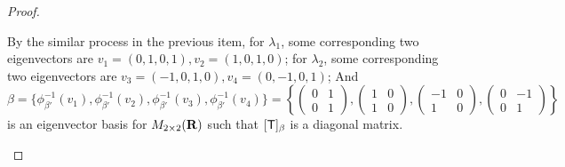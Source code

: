 \begin{proof}
\begin{enumerate}
By the similar process in the previous item,
for \(\lambda_1\), some corresponding two \LID{} eigenvectors are \(v_1 = (0, 1, 0, 1), v_2 = (1, 0, 1, 0)\);
for \(\lambda_2\), some corresponding two \LID{} eigenvectors are \(v_3 = (-1, 0, 1, 0), v_4 = (0, -1, 0, 1)\);
And
\[
    \beta = \{ \phi_{\beta'}^{-1}(v_1), \phi_{\beta'}^{-1}(v_2), \phi_{\beta'}^{-1}(v_3), \phi_{\beta'}^{-1}(v_4) \}
    = \left\{
        \begin{pmatrix} 0 & 1 \\ 0 & 1 \end{pmatrix},
        \begin{pmatrix} 1 & 0 \\ 1 & 0 \end{pmatrix},
        \begin{pmatrix} -1 & 0 \\ 1 & 0 \end{pmatrix},
        \begin{pmatrix} 0 & -1 \\ 0 & 1 \end{pmatrix}
    \right\}
\]
is an eigenvector basis for \(M_{2 \times 2}(\mathbf{R})\) such that \([\textsf{T}]_{\beta}\) is a diagonal matrix.


\end{enumerate}
\end{proof}
